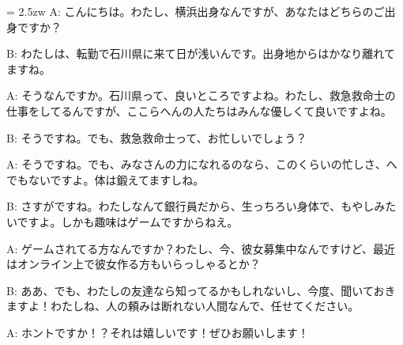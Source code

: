 \documentclass[11pt]{amsart}
\title{}
\author{}
\newenvironment{hangall}[1]{\hangindent = 2.5zw\everypar{\hangindent = 2.5zw}}{}
\begin{document}
\maketitle
\begin{hangall}{}%
A: こんにちは。わたし、横浜出身なんですが、あなたはどちらのご出身ですか？



B: わたしは、転勤で石川県に来て日が浅いんです。出身地からはかなり離れてますね。



A: そうなんですか。石川県って、良いところですよね。わたし、救急救命士の仕事をしてるんですが、ここらへんの人たちはみんな優しくて良いですよね。



B: そうですね。でも、救急救命士って、お忙しいでしょう？



A: そうですね。でも、みなさんの力になれるのなら、このくらいの忙しさ、へでもないですよ。体は鍛えてますしね。



B: さすがですね。わたしなんて銀行員だから、生っちろい身体で、もやしみたいですよ。しかも趣味はゲームですからねえ。



A: ゲームされてる方なんですか？わたし、今、彼女募集中なんですけど、最近はオンライン上で彼女作る方もいらっしゃるとか？



B: ああ、でも、わたしの友達なら知ってるかもしれないし、今度、聞いておきますよ！わたしね、人の頼みは断れない人間なんで、任せてください。



A: ホントですか！？それは嬉しいです！ぜひお願いします！\end{hangall}
\end{document}
